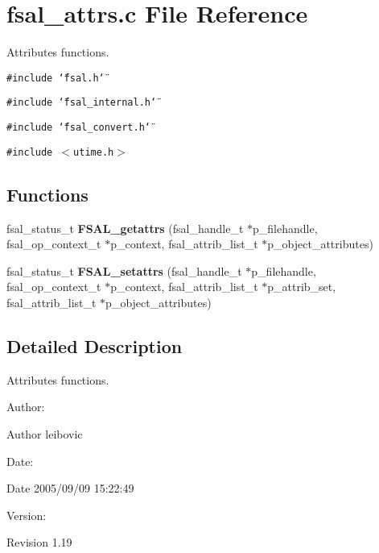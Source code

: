 \section{fsal\_\-attrs.c File Reference}
\label{fsal__attrs_8c}
Attributes functions. 

{\tt \#include \char`\"{}fsal.h\char`\"{}}\par
{\tt \#include \char`\"{}fsal\_\-internal.h\char`\"{}}\par
{\tt \#include \char`\"{}fsal\_\-convert.h\char`\"{}}\par
{\tt \#include $<$utime.h$>$}\par
\subsection*{Functions}
\begin{CompactItemize}
\item 
fsal\_\-status\_\-t {\bf FSAL\_\-getattrs} (fsal\_\-handle\_\-t $\ast$p\_\-filehandle, fsal\_\-op\_\-context\_\-t $\ast$p\_\-context, fsal\_\-attrib\_\-list\_\-t $\ast$p\_\-object\_\-attributes)
\item 
fsal\_\-status\_\-t {\bf FSAL\_\-setattrs} (fsal\_\-handle\_\-t $\ast$p\_\-filehandle, fsal\_\-op\_\-context\_\-t $\ast$p\_\-context, fsal\_\-attrib\_\-list\_\-t $\ast$p\_\-attrib\_\-set, fsal\_\-attrib\_\-list\_\-t $\ast$p\_\-object\_\-attributes)
\end{CompactItemize}


\subsection{Detailed Description}
Attributes functions. 

\begin{Desc}
\item[Author:]\begin{Desc}
\item[Author]leibovic \end{Desc}
\end{Desc}
\begin{Desc}
\item[Date:]\begin{Desc}
\item[Date]2005/09/09 15:22:49 \end{Desc}
\end{Desc}
\begin{Desc}
\item[Version:]\begin{Desc}
\item[Revision]1.19 \end{Desc}
\end{Desc}



